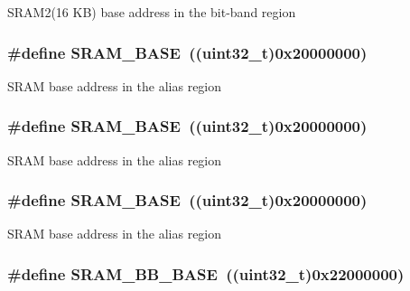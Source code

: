 S\-R\-A\-M2(16 K\-B) base address in the bit-\/band region \hypertarget{group___peripheral__memory__map_ga05e8f3d2e5868754a7cd88614955aecc}{
\subsubsection[{S\-R\-A\-M\-\_\-\-B\-A\-S\-E}]{\setlength{\rightskip}{0pt plus 5cm}\#define S\-R\-A\-M\-\_\-\-B\-A\-S\-E~((uint32\-\_\-t)0x20000000)}}\label{group___peripheral__memory__map_ga05e8f3d2e5868754a7cd88614955aecc}
S\-R\-A\-M base address in the alias region \hypertarget{group___peripheral__memory__map_ga05e8f3d2e5868754a7cd88614955aecc}{
\subsubsection[{S\-R\-A\-M\-\_\-\-B\-A\-S\-E}]{\setlength{\rightskip}{0pt plus 5cm}\#define S\-R\-A\-M\-\_\-\-B\-A\-S\-E~((uint32\-\_\-t)0x20000000)}}\label{group___peripheral__memory__map_ga05e8f3d2e5868754a7cd88614955aecc}
S\-R\-A\-M base address in the alias region \hypertarget{group___peripheral__memory__map_ga05e8f3d2e5868754a7cd88614955aecc}{
\subsubsection[{S\-R\-A\-M\-\_\-\-B\-A\-S\-E}]{\setlength{\rightskip}{0pt plus 5cm}\#define S\-R\-A\-M\-\_\-\-B\-A\-S\-E~((uint32\-\_\-t)0x20000000)}}\label{group___peripheral__memory__map_ga05e8f3d2e5868754a7cd88614955aecc}
S\-R\-A\-M base address in the alias region \hypertarget{group___peripheral__memory__map_gad3548b6e2f017f39d399358f3ac98454}{
\subsubsection[{S\-R\-A\-M\-\_\-\-B\-B\-\_\-\-B\-A\-S\-E}]{\setlength{\rightskip}{0pt plus 5cm}\#define S\-R\-A\-M\-\_\-\-B\-B\-\_\-\-B\-A\-S\-E~((uint32\-\_\-t)0x22000000)}}\label{group___peripheral__memory__map_gad3548b6e2f017f39d399358f3ac98454}
